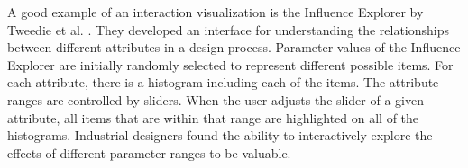 \documentclass{article}
\begin{document}
A good example of an interaction visualization is the Influence Explorer by Tweedie et al. \cite{conf/chi/TweedieSDS95}.  They developed an interface for understanding the relationships between different attributes in a design process.  Parameter values of the Influence Explorer are initially randomly selected to represent different possible items.  For each attribute, there is a histogram including each of the items.  The attribute ranges are controlled by sliders.  When the user adjusts the slider of a given attribute, all items that are within that range are highlighted on all of the histograms.  Industrial designers found the ability to interactively explore the effects of different parameter ranges to be valuable.




\end{document}
